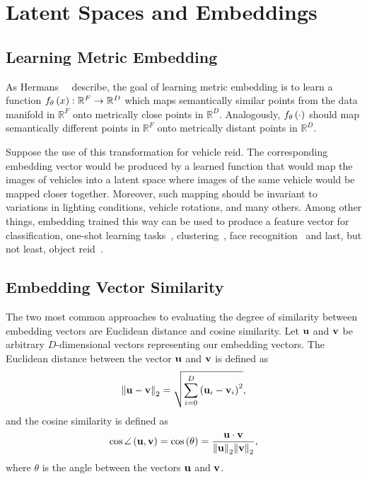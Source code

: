 \section{Latent Spaces and Embeddings}
\label{sec:LatentSpacesAndEmbeddings}

\subsection{Learning Metric Embedding}
\label{ssec:LearningMetricEmbedding}

As Hermans~\etal{}~\cite{hermans2017triplet} describe, the goal of learning metric embedding is to learn a function ${f_\theta} \left( x \right): \mathbb{R}^F \to \mathbb{R}^D$ which maps semantically similar points from the data manifold in $\mathbb{R}^F$ onto metrically close points in $\mathbb{R}^D$. Analogously, ${f_\theta} \left( \cdot \right)$ should map semantically different points in $\mathbb{R}^F$ onto metrically distant points in $\mathbb{R}^D$.

Suppose the use of this transformation for vehicle \gls{reid}. The corresponding embedding vector would be produced by a learned function that would map the images of vehicles into a latent space where images of the same vehicle would be mapped closer together. Moreover, such mapping should be invariant to variations in lighting conditions, vehicle rotations, and many others. Among other things, embedding trained this way can be used to produce a feature vector for classification, one-shot learning tasks~\cite{koch2015siameseoneshot}, clustering~\cite{schroff2015facenet}, face recognition~\cite{parkhi2015deepface} and last, but not least, object \gls{reid}~\cite{kuma2019vehiclereid}.

\subsection{Embedding Vector Similarity}
\label{ssec:EmbeddingVectorSimilarity}

The two most common approaches to evaluating the degree of similarity between embedding vectors are Euclidean distance and cosine similarity. Let $\mathbf{u}$ and $\mathbf{v}$ be arbitrary $D$-dimensional vectors representing our embedding vectors. The Euclidean distance between the vector $\mathbf{u}$ and $\mathbf{v}$ is defined as
\begin{equation}
    \label{eq:EuclideanDistance}
    {\left\Vert {\mathbf{u} - \mathbf{v}} \right\Vert}_2 =
    \sqrt{
        \sum_{i = 0}^{D} \left( {\mathbf{u}_i - \mathbf{v}_i} \right)^2
    },
\end{equation}
and the cosine similarity is defined as
\begin{equation}
    \label{eq:CosineSimilarity}
    {\cos \angle} \left( \mathbf{u}, \mathbf{v} \right) =
    {\cos} \left( \theta \right) =
    \frac{
        \mathbf{u} \cdot \mathbf{v}
    }{
        {\left\Vert {\mathbf{u}} \right\Vert}_2 {\left\Vert {\mathbf{v}} \right\Vert}_2
    },
\end{equation}
where $\theta$ is the angle between the vectors $\mathbf{u}$ and $\mathbf{v}$.

